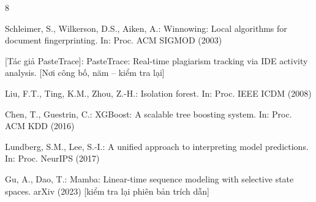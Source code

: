 \documentclass[runningheads]{llncs}
\begin{document}
\begin{thebibliography}{8}

Schleimer, S., Wilkerson, D.S., Aiken, A.: Winnowing: Local algorithms for
document fingerprinting. In: Proc. ACM SIGMOD (2003)

[Tác giả PasteTrace]: PasteTrace: Real-time plagiarism tracking via IDE
activity analysis. [Nơi công bố, năm -- kiểm tra lại]

Liu, F.T., Ting, K.M., Zhou, Z.-H.: Isolation forest. In: Proc. IEEE ICDM
(2008)

Chen, T., Guestrin, C.: XGBoost: A scalable tree boosting system. In: Proc.
ACM KDD (2016)

Lundberg, S.M., Lee, S.-I.: A unified approach to interpreting model
predictions. In: Proc. NeurIPS (2017)

Gu, A., Dao, T.: Mamba: Linear-time sequence modeling with selective state
spaces. arXiv (2023) [kiểm tra lại phiên bản trích dẫn]

\end{thebibliography}
\end{document}
